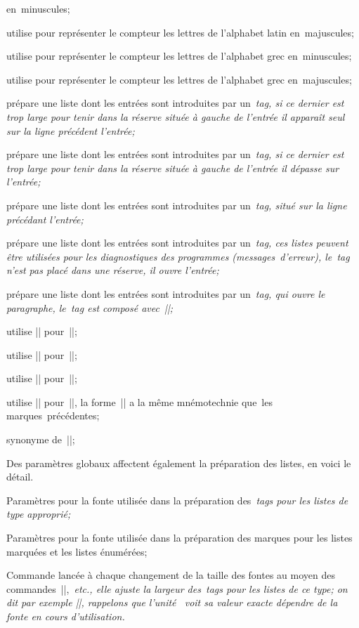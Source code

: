  en~minuscules;
\item\A
 utilise pour représenter le compteur les lettres de l'alphabet latin
 en~majuscules;
\item\alpha
 utilise pour représenter le compteur les lettres de l'alphabet grec
 en~minuscules;
\item\Alpha
 utilise pour représenter le compteur les lettres de l'alphabet grec
 en~majuscules;
\medskip
\item\tag
 prépare une liste dont les entrées sont introduites par un~\em{tag},
 si ce dernier est trop large pour tenir dans la réserve située à
 gauche de l'entrée il apparaît seul sur la ligne précédent l'entrée;
\item\hang
 prépare une liste dont les entrées sont introduites par un~\em{tag},
 si ce dernier est trop large pour tenir dans la réserve située à
 gauche de l'entrée il dépasse sur l'entrée;
\item\ohang
 prépare une liste dont les entrées sont introduites par un~\em{tag},
 situé sur la ligne précédant l'entrée;
\item\diag
 prépare une liste dont les entrées sont introduites par un~\em{tag},
 ces listes peuvent être utilisées pour les diagnostiques des
 programmes (messages~d'erreur), le~\em{tag} n'est pas placé dans une
 réserve, il ouvre l'entrée;
\item\inset
 prépare une liste dont les entrées sont introduites par un~\em{tag},
 qui ouvre le paragraphe, le~\em{tag} est composé avec~|\listtagfont|;
\medskip
\item\literal
 utilise |\literalfont| pour~|\listtagfont|;
\item\symbolic
 utilise |\symbolicfont| pour~|\listtagfont|;
\item\emphasis
 utilise |\emphasisfont| pour~|\listtagfont|;
\item\natural
 utilise |\mainfont| pour~|\listtagfont|, la forme~|\main|
 a la même mnémotechnie que~les marques~précédentes;
\item\main
 synonyme de~|\natural|;
\endcslist

Des paramètres globaux affectent également la préparation des listes,
en voici le détail.
\begincslist
\item\listtagfont
 Paramètres pour la fonte utilisée dans la préparation des~\em{tags} pour
 les listes de type approprié;
\item\listmarkfont
 Paramètres pour la fonte utilisée dans la préparation des marques
 pour les listes marquées et les listes énumérées;
\item\listtagwidthadjust
 Commande lancée à chaque changement de la taille des fontes au moyen
 des commandes~|\tenpoint|,~\em{etc.}, elle ajuste la largeur
 des~\em{tags} pour les listes de ce type; on dit par exemple
 |\def\listtagwidthadjust{\listtagwidth=4em\relax}|, rappelons que
 l'unité~ voit sa valeur exacte dépendre de la fonte en cours
 d'utilisation.
\endcslist


